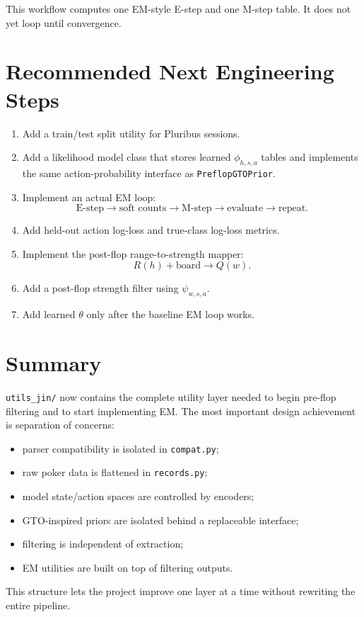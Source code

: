 \documentclass[11pt]{article}
\begin{document}
This workflow computes one EM-style E-step and one M-step table. It does not yet
loop until convergence.

\section{Recommended Next Engineering Steps}

\begin{enumerate}[leftmargin=*]
  \item Add a train/test split utility for Pluribus sessions.
  \item Add a likelihood model class that stores learned \(\phi_{h,s,a}\)
  tables and implements the same action-probability interface as
  \texttt{PreflopGTOPrior}.
  \item Implement an actual EM loop:
  \[
  \text{E-step} \rightarrow \text{soft counts} \rightarrow \text{M-step}
  \rightarrow \text{evaluate} \rightarrow \text{repeat}.
  \]
  \item Add held-out action log-loss and true-class log-loss metrics.
  \item Implement the post-flop range-to-strength mapper:
  \[
  R(h) + \text{board} \rightarrow Q(w).
  \]
  \item Add a post-flop strength filter using \(\psi_{w,s,a}\).
  \item Add learned \(\theta\) only after the baseline EM loop works.
\end{enumerate}

\section{Summary}

\texttt{utils\_jin/} now contains the complete utility layer needed to begin
pre-flop filtering and to start implementing EM. The most important design
achievement is separation of concerns:

\begin{itemize}[leftmargin=*]
  \item parser compatibility is isolated in \texttt{compat.py};
  \item raw poker data is flattened in \texttt{records.py};
  \item model state/action spaces are controlled by encoders;
  \item GTO-inspired priors are isolated behind a replaceable interface;
  \item filtering is independent of extraction;
  \item EM utilities are built on top of filtering outputs.
\end{itemize}

This structure lets the project improve one layer at a time without rewriting
the entire pipeline.
\end{document}
